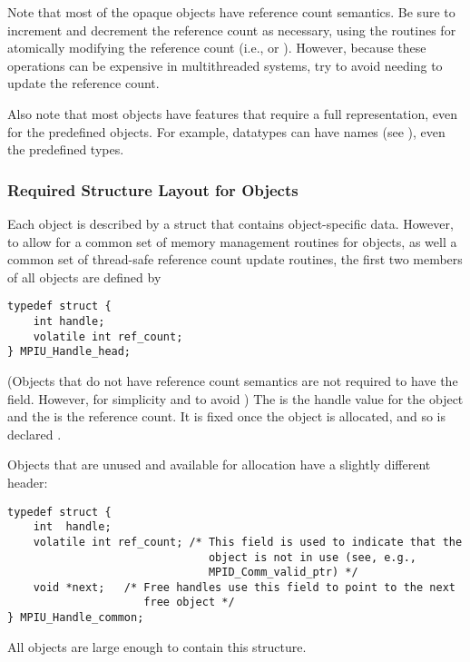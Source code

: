 \documentclass{article}
\begin{document}
Note that most of the opaque objects have reference count semantics.
Be sure to increment and decrement the reference count as necessary,
using the routines for atomically modifying the reference count (i.e.,
 or ).
However, because these operations can be expensive in multithreaded
systems, try to avoid needing to update the reference count.


Also note that most objects have features that require a full
representation, even for the predefined objects.  For example,
datatypes can have names (see ), even the
predefined types.

\subsubsection{Required Structure Layout for Objects}
\label{sec:object-layout}
Each object is described by a struct that contains object-specific
data.  However, to allow for a common set of memory management
routines for objects, as well a common set of thread-safe reference
count update routines, the first two members of all objects are
defined by
\begin{verbatim}
typedef struct {
    int handle;
    volatile int ref_count;
} MPIU_Handle_head;
\end{verbatim}
(Objects that do not have reference count semantics are not required
to have the 
 field.  However, for simplicity and to avoid )  The  is the handle value for the
object and the  is the reference count.  It is fixed
once the object is allocated, and so is declared .

Objects that are unused and available for allocation have a slightly
different header:
\begin{verbatim}
typedef struct {
    int  handle;
    volatile int ref_count; /* This field is used to indicate that the
                               object is not in use (see, e.g., 
                               MPID_Comm_valid_ptr) */
    void *next;   /* Free handles use this field to point to the next
                     free object */
} MPIU_Handle_common;
\end{verbatim}
All objects are large enough to contain this structure.  
\end{document}
